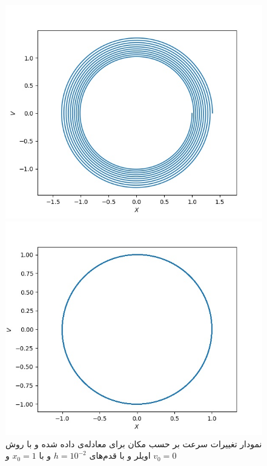 \documentclass[11pt, a4paper]{article}
\begin{document}
\begin{figure}[h!]
	\centering
  \begin{minipage}[b]{0.4\textwidth}
    \includegraphics[width=\textwidth]{q2_v_x_Euler Method_0_62.83185307179586_0.01_[1, 0].jpg}
    \caption{نمودار تغییرات سرعت بر حسب مکان برای معادله‌ی داده شده و با روش اویلر و با قدم‌های $h = 10^{-2}$ و با $x_0 = 1$ و $v_0 = 0$}
    \label{fig:q2_euler}
  \end{minipage}
  \hfill
  \begin{minipage}[b]{0.4\textwidth}
    \includegraphics[width=\textwidth]{q2_v_x_Euler-Cromer Method_0_62.83185307179586_0.01_[1, 0].jpg}

\end{minipage}
\end{figure}
\end{document}

